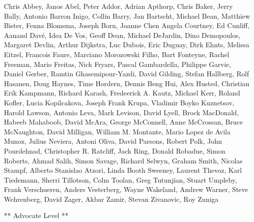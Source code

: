\documentclass[]{memoir}
\begin{document}
Chris Abbey, Janos Abel, Peter Addor, Adrian Apthorp, Chris Baker, Jerry
Bally, Antonio Barron Inigo, Collin Barry, Jan Bartscht, Michael Bean,
Matthiew Bister, Fenna Blomsma, Joseph Born, Joanne Chen Angela
Courtney, Ed Cunliff, Aanand Davé, Idea De Vos, Geoff Dean, Michael
DeJardin, Dino Demopoulos, Margaret Devlin, Arthur Dijkstra, Luc Dubois,
Eric Duguay, Dirk Ehnts, Melissa Eitzel, Francois Faure, Marciano
Morozowski Filho, Bart Fonteyne, Rachel Freeman, Mario Freitas, Nick
Fryars, Pascal Gambardella, Philippe Garvie, Daniel Gerber, Ramtin
Ghasemipour-Yazdi, David Gilding, Stefan Hallberg, Rolf Hasanen, Doug
Haynes, Time Hordern, Dennis Beng Hui, Alex Husted, Christian Erik
Kampmann, Richard Karash, Fredeerick A. Kautz, Michael Kerr, Roland
Kofler, Lucia Kopilcakova, Joseph Frank Krupa, Vladimir Boyko Kuznetsov,
Harold Lawson, Antonio Leva, Mark Levison, David Lyell, Brock MacDonald,
Habeeb Mahaboob, David McAra, George McConnell, Anne McCrossan, Bruce
McNaughton, David Milligan, William M. Montante, Mario Lopez de Avila
Munoz, Julius Neviera, Antoni Oliva, David Parsons, Robert Polk, John
Pourdehnad, Christopher R. Ratcliff, Jack Ring, Donald Robadue, Simon
Roberts, Ahmad Salih, Simon Savage, Richard Selwyn, Graham Smith,
Nicolas Stampf, Alberto Stanislao Atzori, Linda Booth Sweeney, Laurent
Thevoz, Karl Tiedemann, Sherri Tillotson, Colm Toolan, Greg Tutunjian,
Stuart Umpleby, Frank Verschueren, Anders Vesterberg, Wayne Wakeland,
Andrew Warner, Steve Wehrenberg, David Zager, Akbar Zamir, Stevan
Zivanovic, Roy Zuniga

** Advocate Level **
\end{document}
